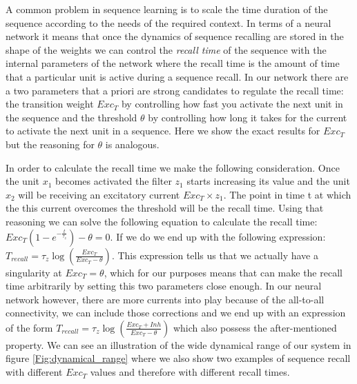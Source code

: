 \documentclass{esannV2}
\begin{document}
A common problem in sequence learning is to scale the time duration of the sequence according to the needs of the required context. In terms of a neural network it means that once the dynamics of sequence recalling are stored in the shape of the weights we can control the \textit{recall time} of the sequence with the internal parameters of the network where the recall time is the amount of time that a particular unit is active during a sequence recall. In our network there are a two parameters that a priori are strong candidates to regulate the recall time: the transition weight $Exc_T$ by controlling how fast you activate the next unit in the sequence and the threshold $\theta$ by controlling how long it takes for the current to activate the next unit in a sequence. Here we show the exact results for $Exc_T$ but the reasoning for $\theta$ is analogous.  

In order to calculate the recall time we make the following consideration. Once the unit $x_1$ becomes activated the filter $z_1$ starts increasing its value and the unit $x_2$ will be receiving an excitatory current $Exc_T \times z_1$. The point in time t at which the this current overcomes the threshold will be the recall time. Using that reasoning we can solve the following equation to calculate the recall time: $Exc_{T}(1 - e^{-\frac{t}{\tau_z}}) - \theta = 0$. If we do we end up with the following expression: $T_{recall} = \tau_z \log(\frac{Exc_T}{Exc_T - \theta})$. This expression tells us that we actually have a singularity at $Exc_T = \theta$, which for our purposes means that can make the recall time arbitrarily by setting this two parameters close enough. In our neural network however, there are more currents into play because of the all-to-all connectivity, we can include those corrections and we end up with an expression of the form $T_{recall} = \tau_z \log(\frac{Exc_T + Inh}{Exc_T - \theta})$ which also possess the after-mentioned property. We can see an illustration of the wide dynamical range of our system in figure \ref{Fig:dynamical_range} where we also show two examples of sequence recall with different $Exc_T$ values and therefore with different recall times. 
\end{document}
